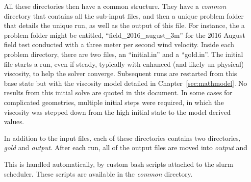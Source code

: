 All these directories then have a common structure. They have a {\it
common} directory that contains all the sub-input files, and then a
unique problem folder that details the unique run, as well as the output
of this file. For instance, the a problem folder might be entitled,
``field\_2016\_august\_3m'' for the 2016 August field test conducted
with a three meter per second wind velocity. Inside each problem
directory, there are two files, an ``initial.in'' and a ``gold.in''. The
initial file starts a run, even if steady, typically with enhanced (and
likely un-physical) viscosity, to help the solver converge. Subsequent
runs are restarted from this base state but with the viscosity model
detailed in Chapter~\ref{sec:mathmodel}. No results from this initial
solve are quoted in this document. In some cases for complicated
geometries, multiple initial steps were required, in which the viscosity
was stepped down from the high initial state to the model derived
values. 

In addition to the input files, each of these directories contains two
directories, {\it gold} and {\it output}. After each run, all of the
output files are moved into {\it output} and

This is handled automatically, by custom bash scripts attached to the
slurm scheduler. These scripts are available in the {\it common}
directory. 

